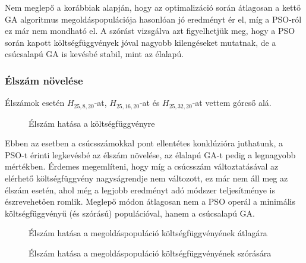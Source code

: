 Nem meglepő a korábbiak alapján, hogy az optimalizáció során átlagosan a kettő GA algoritmus megoldáspopulációja hasonlóan jó eredményt ér el, míg a PSO-ról ez már nem mondható el. A szórást vizsgálva azt figyelhetjük meg, hogy a PSO során kapott költségfüggvények jóval nagyobb kilengéseket mutatnak, de a csúcsalapú GA is kevésbé stabil, mint az élalapú.

\subsubsection{Élszám növelése}

Élszámok esetén $H_{25,8,20}$-at, $H_{25,16,20}$-at és $H_{25,32,20}$-at vettem górcső alá.

\begin{figure}[H]
	\centering
	\hspace{5pt}
	\hspace{5pt}
	\caption{Élszám hatása a költségfüggvényre}
\end{figure}

Ebben az esetben a csúcsszámokkal pont ellentétes konklúzióra juthatunk, a PSO-t érinti legkevésbé az élszám növelése, az élalapú GA-t pedig a legnagyobb mértékben. Érdemes megemlíteni, hogy míg a csúcsszám változtatásával az elérhető költségfüggvény nagyságrendje nem változott, ez már nem áll meg az élszám esetén, ahol még a legjobb eredményt adó módszer teljesítménye is észrevehetően romlik. Meglepő módon átlagosan nem a PSO operál a minimális költségfüggvényű (és szórású) populációval, hanem a csúcsalapú GA.

\begin{figure}[H]
	\centering
	\hspace{5pt}
	\hspace{5pt}
	\caption{Élszám hatása a megoldáspopuláció költségfüggvényének átlagára}
\end{figure}

\begin{figure}[H]
	\centering
	\hspace{5pt}
	\hspace{5pt}
	\caption{Élszám hatása a megoldáspopuláció költségfüggvényének szórására}
\end{figure}

